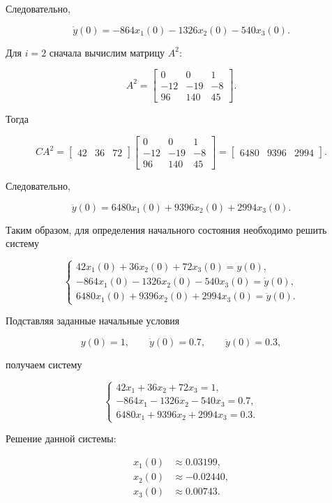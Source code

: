\documentclass[a4paper, 12pt]{article}
\begin{document}
Следовательно,

\[
\dot{y}(0) =
-864x_1(0) - 1326x_2(0) - 540x_3(0).
\]

Для $i=2$ сначала вычислим матрицу $A^2$:

\[
A^2 =
\begin{bmatrix}
0 & 0 & 1\\
-12 & -19 & -8\\
96 & 140 & 45
\end{bmatrix}.
\]

Тогда

\[
CA^2 =
\begin{bmatrix}
42 & 36 & 72
\end{bmatrix}
\begin{bmatrix}
0 & 0 & 1\\
-12 & -19 & -8\\
96 & 140 & 45
\end{bmatrix}
=
\begin{bmatrix}
6480 & 9396 & 2994
\end{bmatrix}.
\]

Следовательно,

\[
\ddot{y}(0) =
6480x_1(0) + 9396x_2(0) + 2994x_3(0).
\]

Таким образом, для определения начального состояния необходимо решить
систему

\[
\begin{cases}
42x_1(0) + 36x_2(0) + 72x_3(0) = y(0),\\
-864x_1(0) - 1326x_2(0) - 540x_3(0) = \dot{y}(0),\\
6480x_1(0) + 9396x_2(0) + 2994x_3(0) = \ddot{y}(0).
\end{cases}
\]

Подставляя заданные начальные условия

\[
y(0)=1,\qquad
\dot{y}(0)=0.7,\qquad
\ddot{y}(0)=0.3,
\]

получаем систему

\[
\begin{cases}
42x_1 + 36x_2 + 72x_3 = 1,\\
-864x_1 - 1326x_2 - 540x_3 = 0.7,\\
6480x_1 + 9396x_2 + 2994x_3 = 0.3.
\end{cases}
\]

Решение данной системы:

\[
\begin{aligned}
x_1(0) &\approx 0.03199,\\
x_2(0) &\approx -0.02440,\\
x_3(0) &\approx 0.00743.
\end{aligned}
\]
\end{document}
